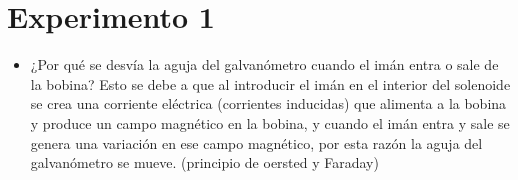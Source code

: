 \documentclass[letterpaper, 12pt]{report}
\begin{document}
\section*{Experimento 1}

\begin{itemize}
    \item ¿Por qué se desvía la aguja del galvanómetro cuando el imán entra o sale de la bobina?
    Esto se debe a que al introducir el imán en el interior del solenoide se crea una corriente eléctrica (corrientes inducidas) que alimenta a la bobina y produce un campo magnético en la bobina, y cuando el imán entra y sale se genera una variación en ese campo magnético, por esta razón la aguja del galvanómetro se mueve. (principio de oersted y Faraday) 
    
\end{itemize}



\newpage

\printbibliography
\end{document}
